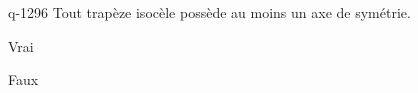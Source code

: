 \begin{truefalse}{q-1296}
Tout trapèze isocèle possède au moins un axe de symétrie.
\item* Vrai
\item Faux
\end{truefalse}

